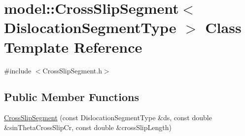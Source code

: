 \hypertarget{classmodel_1_1_cross_slip_segment}{}\section{model\+:\+:Cross\+Slip\+Segment$<$ Dislocation\+Segment\+Type $>$ Class Template Reference}
\label{classmodel_1_1_cross_slip_segment}


{\ttfamily \#include $<$Cross\+Slip\+Segment.\+h$>$}

\subsection*{Public Member Functions}
\begin{DoxyCompactItemize}
\item 
\hyperlink{classmodel_1_1_cross_slip_segment_a2ad5f0507b8fb4b7bc3de851a177fc32}{Cross\+Slip\+Segment} (const Dislocation\+Segment\+Type \&ds, const double \&sin\+Theta\+Cross\+Slip\+Cr, const double \&cross\+Slip\+Length)
\end{DoxyCompactItemize}
